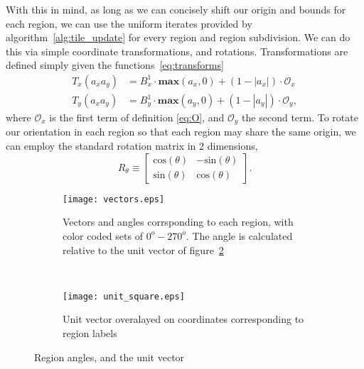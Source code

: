 With this in mind, as long as we can concisely shift our origin and bounds for each region, we can use the
uniform iterates provided by algorithm~\ref{alg:tile_update} for every region and region subdivision.
We can do this via simple coordinate transformations,
and rotations.  Transformations are defined simply given the functions~\ref{eq:transforms}
\begin{eqnarray}
  T_x(a_xa_y) &= B_x^1 \cdot \mathbf{max}(a_x,0) + (1 - |a_x|) \cdot \mathcal{O}_x\\
  T_y(a_xa_y) &= B_y^1 \cdot \mathbf{max}(a_y,0) + (1 - |a_y|) \cdot \mathcal{O}_y,
  \label{eq:transforms}
\end{eqnarray}
where $\mathcal{O}_x$ is the first term of definition \ref{eq:O}, and $\mathcal{O}_y$ the second term.  To
rotate our orientation in each region so that each region may share the same origin, we can employ the
standard rotation matrix in 2 dimensions,
\begin{equation}
  R_{\theta} \equiv \begin{bmatrix}
    \text{cos} (\theta) & - \text{sin}(\theta) \\
    \text{sin}(\theta) & \text{cos}(\theta)
    \end{bmatrix}.
\end{equation}

\begin{figure}[h]
  \centering
  \begin{subfigure}[h]{.5\textwidth}
    \centering
    \texttt{[image: vectors.eps]}
    \caption{Vectors and angles corrsponding to each
    region, with color coded sets of $0^o - 270^o$.  The
    angle is calculated relative to the unit vector of
    figure~\ref{subfig:unit}}
    \label{subfig:all_vectors}
  \end{subfigure}
  ~
  \begin{subfigure}[h]{.4\textwidth}
    \centering
    \texttt{[image: unit\_square.eps]}
    \caption{Unit vector overalayed on coordinates
    corresponding to region labels}
    \label{subfig:unit}
    \end{subfigure}
  \caption{Region angles, and the unit vector}
  \label{fig:vectors}
\end{figure}

